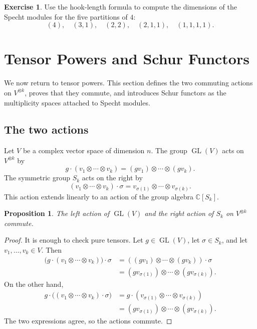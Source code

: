 \documentclass[12pt,a4paper]{article}
\newtheorem{proposition}[theorem]{Proposition}
\theoremstyle{definition}
\newtheorem{exercise}[theorem]{Exercise}
\theoremstyle{remark}
\newcommand{\C}{\mathbb{C}}
\newcommand{\GL}{\operatorname{GL}}
\begin{document}
\begin{exercise}
Use the hook-length formula to compute the dimensions of the Specht modules
for the five partitions of \(4\):
\[
(4),\quad (3,1),\quad (2,2),\quad (2,1,1),\quad (1,1,1,1).
\]
\end{exercise}

\section{Tensor Powers and Schur Functors}

We now return to tensor powers.  This section defines the two commuting
actions on \(V^{\otimes k}\), proves that they commute, and introduces Schur
functors as the multiplicity spaces attached to Specht modules.

\subsection{The two actions}

Let \(V\) be a complex vector space of dimension \(n\).  The group \(\GL(V)\)
acts on \(V^{\otimes k}\) by
\[
g\cdot(v_1\otimes\cdots\otimes v_k)
  =(gv_1)\otimes\cdots\otimes(gv_k).
\]
The symmetric group \(S_k\) acts on the right by
\[
(v_1\otimes\cdots\otimes v_k)\cdot\sigma
  =v_{\sigma(1)}\otimes\cdots\otimes v_{\sigma(k)}.
\]
This action extends linearly to an action of the group algebra \(\C[S_k]\).

\begin{proposition}
The left action of \(\GL(V)\) and the right action of \(S_k\) on
\(V^{\otimes k}\) commute.
\end{proposition}

\begin{proof}
It is enough to check pure tensors.  Let \(g\in \GL(V)\), let
\(\sigma\in S_k\), and let \(v_1,\dots,v_k\in V\).  Then
\[
\begin{aligned}
\bigl(g\cdot(v_1\otimes\cdots\otimes v_k)\bigr)\cdot\sigma
&=((gv_1)\otimes\cdots\otimes(gv_k))\cdot\sigma\\
&=(gv_{\sigma(1)})\otimes\cdots\otimes(gv_{\sigma(k)}).
\end{aligned}
\]
On the other hand,
\[
\begin{aligned}
g\cdot\bigl((v_1\otimes\cdots\otimes v_k)\cdot\sigma\bigr)
&=g\cdot(v_{\sigma(1)}\otimes\cdots\otimes v_{\sigma(k)})\\
&=(gv_{\sigma(1)})\otimes\cdots\otimes(gv_{\sigma(k)}).
\end{aligned}
\]
The two expressions agree, so the actions commute.
\end{proof}
\end{document}
